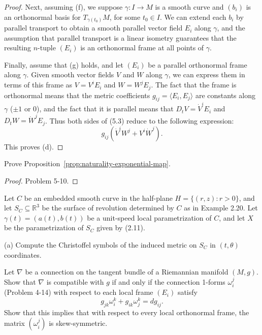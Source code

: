\begin{proof}
Next, assuming (f), we suppose $\gamma : I \to M$ is a smooth curve and $(b_i)$ is an orthonormal basis for $T_{\gamma(t_0)}M$, for some $t_0 \in I$. We can extend each $b_i$ by parallel transport to obtain a smooth parallel vector field $E_i$ along $\gamma$, and the assumption that parallel transport is a linear isometry guarantees that the resulting $n$-tuple $(E_i)$ is an orthonormal frame at all points of $\gamma$.

Finally, assume that (g) holds, and let $(E_i)$ be a parallel orthonormal frame along $\gamma$. Given smooth vector fields $V$ and $W$ along $\gamma$, we can express them in terms of this frame as $V = V^i E_i$ and $W = W^j E_j$. The fact that the frame is orthonormal means that the metric coefficients $g_{ij} = \langle E_i, E_j \rangle$ are constants along $\gamma$ ($\pm 1$ or $0$), and the fact that it is parallel means that $D_t V = \dot{V}^i E_i$ and $D_t W = \dot{W}^j E_j$. Thus both sides of (5.3) reduce to the following expression:
\[
g_{ij} (\dot{V}^i W^j + V^i \dot{W}^j).
\]
This proves (d).
\end{proof}

\begin{exercise}
\label{exer:prove-proposition-5-20}

Prove Proposition~\ref{prop:naturality-exponential-map}.
\end{exercise}
\begin{proof}
Problem 5-10.
\end{proof}

\begin{exercise}
\label{prob:christoffel-symbols-surface-revolution}

Let $C$ be an embedded smooth curve in the half-plane $H = \{(r,z) : r > 0\}$, and let $S_C \subseteq \mathbb{R}^3$ be the surface of revolution determined by $C$ as in Example 2.20. Let $\gamma(t) = (a(t), b(t))$ be a unit-speed local parametrization of $C$, and let $X$ be the parametrization of $S_C$ given by (2.11).

(a) Compute the Christoffel symbols of the induced metric on $S_C$ in $(t,\theta)$ coordinates.
\end{exercise}

\begin{exercise}
\label{prob:connection-forms-compatibility}

Let $\nabla$ be a connection on the tangent bundle of a Riemannian manifold $(M,g)$. Show that $\nabla$ is compatible with $g$ if and only if the connection 1-forms $\omega_i^j$ (Problem 4-14) with respect to each local frame $(E_i)$ satisfy
\[
g_{jk}\omega_i^k + g_{ik}\omega_j^k = dg_{ij}.
\]
Show that this implies that with respect to every local orthonormal frame, the matrix $(\omega_i^j)$ is skew-symmetric.
\end{exercise}

